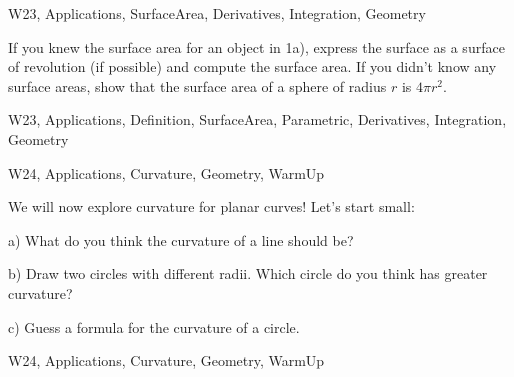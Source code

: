 \begin{tagblock}{W23, Applications, SurfaceArea, Derivatives, Integration, Geometry}
\begin{question}
	
If you knew the surface area for an object in 1a), express the surface as a surface of revolution (if possible) and compute the surface area. If you didn't know any surface areas, show that the surface area of a sphere of radius $r$ is $4\pi r^2$. 

    
\begin{tags}
        W23, Applications, Definition, SurfaceArea, Parametric, Derivatives, Integration, Geometry
\end{tags}
    
\begin{diary}
\end{diary}
	
\begin{solution}

\end{solution}
	
\end{question}

\end{tagblock}

\begin{tagblock}{W24, Applications, Curvature, Geometry, WarmUp}
\begin{question}
	

We will now explore curvature for planar curves! Let's start small:

\bigskip

a) What do you think the curvature of a line should be?  

\bigskip

b) Draw two circles with different radii. Which circle do you think has greater curvature?

\bigskip

c) Guess a formula for the curvature of a circle. 

    
\begin{tags}
       W24, Applications, Curvature, Geometry, WarmUp
\end{tags}
    
\begin{diary}
\end{diary}
	
\begin{solution}

\end{solution}
	
\end{question}

\end{tagblock}

